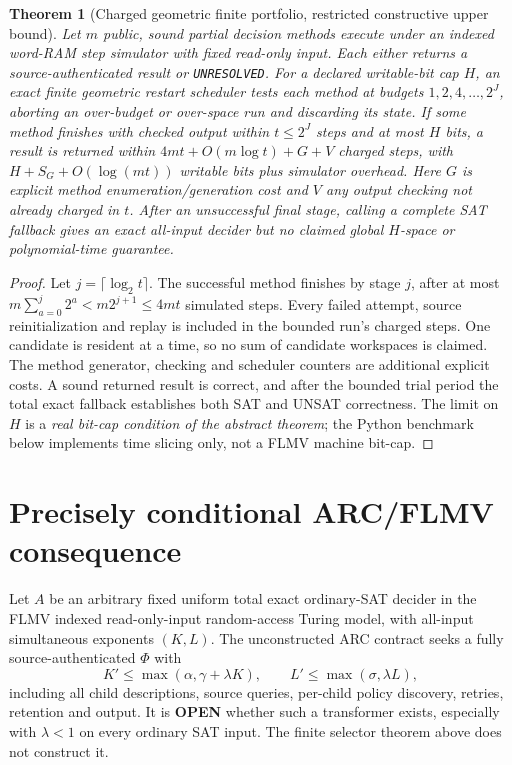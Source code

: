 \documentclass[10pt]{article}
\newtheorem{theorem}{Theorem}
\begin{document}
\begin{theorem}[Charged geometric finite portfolio, restricted constructive upper bound]\label{thm:budget}
Let $m$ public, \emph{sound} partial decision methods execute under an indexed word-RAM step simulator with fixed read-only input. Each either returns a source-authenticated result or \texttt{UNRESOLVED}. For a declared writable-bit cap $H$, an exact finite geometric restart scheduler tests each method at budgets $1,2,4,\ldots,2^J$, aborting an over-budget or over-space run and discarding its state. If some method finishes with checked output within $t\le 2^J$ steps and at most $H$ bits, a result is returned within $4mt+O(m\log t)+G+V$ charged steps, with $H+S_G+O(\log(mt))$ writable bits plus simulator overhead. Here $G$ is explicit method enumeration/generation cost and $V$ any output checking not already charged in $t$. After an unsuccessful final stage, calling a complete SAT fallback gives an exact all-input decider but \emph{no claimed global $H$-space or polynomial-time guarantee}.
\end{theorem}
\begin{proof}
Let $j=\lceil\log_2 t\rceil$. The successful method finishes by stage $j$, after at most $m\sum_{a=0}^j2^a<m2^{j+1}\le4mt$ simulated steps. Every failed attempt, source reinitialization and replay is included in the bounded run's charged steps. One candidate is resident at a time, so no sum of candidate workspaces is claimed. The method generator, checking and scheduler counters are additional explicit costs. A sound returned result is correct, and after the bounded trial period the total exact fallback establishes both SAT and UNSAT correctness. The limit on $H$ is a \emph{real bit-cap condition of the abstract theorem}; the Python benchmark below implements time slicing only, not a FLMV machine bit-cap.
\end{proof}

\section{Precisely conditional ARC/FLMV consequence}
Let $A$ be an arbitrary fixed uniform total exact ordinary-SAT decider in the FLMV indexed read-only-input random-access Turing model, with all-input simultaneous exponents $(K,L)$. The unconstructed ARC contract seeks a fully source-authenticated $\Phi$ with
\[
K'\le\max(\alpha,\gamma+\lambda K),\qquad
L'\le\max(\sigma,\lambda L),
\]
including all child descriptions, source queries, per-child policy discovery, retries, retention and output. It is \textbf{OPEN} whether such a transformer exists, especially with $\lambda<1$ on every ordinary SAT input. The finite selector theorem above does not construct it.
\end{document}
